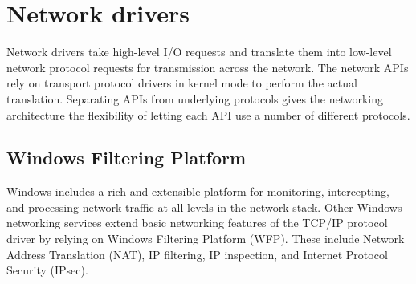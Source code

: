 \vspace{5mm}
\section{Network drivers}
\vspace{5mm}

Network drivers take high-level I/O requests and translate them into low-level network protocol
requests for transmission across the network. The network APIs rely on transport protocol drivers in
kernel mode to perform the actual translation. Separating APIs from underlying protocols gives the
networking architecture the flexibility of letting each API use a number of different protocols.

\vspace{5mm}
\subsection{Windows Filtering Platform}
\vspace{5mm}

\cite{BOOK:1} Windows includes a rich and extensible platform for monitoring, intercepting, and processing
network traffic at all levels in the network stack. Other Windows networking services extend basic
networking features of the TCP/IP protocol driver by relying on Windows Filtering Platform (WFP).
These include Network Address Translation (NAT), IP filtering, IP inspection, and Internet Protocol
Security (IPsec).

\vspace{5mm}

